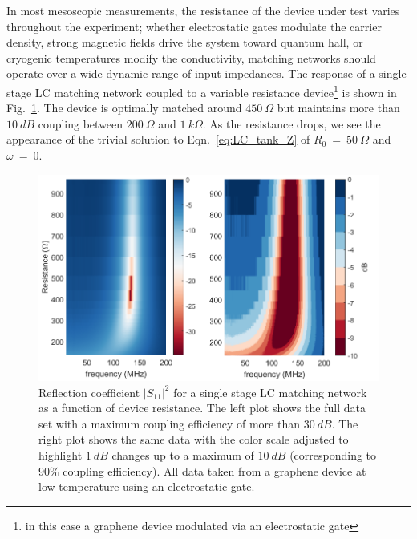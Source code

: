 In most mesoscopic measurements, the resistance of the device under test varies throughout the experiment; whether electrostatic gates modulate the carrier density, strong magnetic fields drive the system toward quantum hall, or cryogenic temperatures modify the conductivity, matching networks should operate over a wide dynamic range of input impedances. The response of a single stage LC matching network coupled to a variable resistance device\footnote{in this case a graphene device modulated via an electrostatic gate} is shown in Fig.~\ref{fig:S11vsR}. The device is optimally matched around $450~\Omega$ but maintains more than $10~dB$ coupling between $200~\Omega$ and $1~k\Omega$. As the resistance drops, we see the appearance of the trivial solution to Eqn.~\ref{eq:LC_tank_Z} of $R_0~=~50~\Omega$ and $\omega~=~0$. 
\begin{figure}
\centering
\includegraphics[width=120mm]{figures/Johnson_noise_thermometry/S11vsR.png}
\caption{Reflection coefficient $|S_{11}|^2$ for a single stage LC matching network as a function of device resistance. The left plot shows the full data set with a maximum coupling efficiency of more than $30~dB$. The right plot shows the same data with the color scale adjusted to highlight $1~dB$ changes up to a maximum of $10~dB$ (corresponding to $90\%$ coupling efficiency). All data taken from a graphene device at low temperature using an electrostatic gate.}
\label{fig:S11vsR}
\end{figure}

